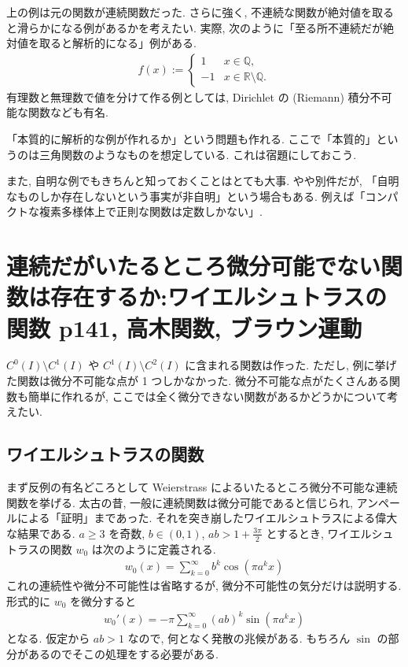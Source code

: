 \documentclass[openany, a4paper, oneside]{book}
\theoremstyle{break}
\theoremstyle{breakdefn}
\begin{document}
上の例は元の関数が連続関数だった.
さらに強く, 不連続な関数が絶対値を取ると滑らかになる例があるかを考えたい.
実際, 次のように「至る所不連続だが絶対値を取ると解析的になる」例がある.
\begin{align}
 f (x)
 :=
 \begin{cases}
  1  & x \in \mathbb{Q}, \\
  -1 & x \in \mathbb{R} \setminus \mathbb{Q}.
 \end{cases}
\end{align}
有理数と無理数で値を分けて作る例としては, Dirichlet の (Riemann) 積分不可能な関数なども有名.

「本質的に解析的な例が作れるか」という問題も作れる.
ここで「本質的」というのは三角関数のようなものを想定している.
これは宿題にしておこう.

また, 自明な例でもきちんと知っておくことはとても大事.
やや別件だが, 「自明なものしか存在しないという事実が非自明」という場合もある.
例えば「コンパクトな複素多様体上で正則な関数は定数しかない」.
\section{連続だがいたるところ微分可能でない関数は存在するか:ワイエルシュトラスの関数 \cite{WilliamDumham1} p141, 高木関数, ブラウン運動}
\label{sec-11-3-6}

$C^0 (I) \setminus C^1 (I)$ や $C^1 (I) \setminus C^2 (I)$ に含まれる関数は作った.
ただし, 例に挙げた関数は微分不可能な点が 1 つしかなかった.
微分不可能な点がたくさんある関数も簡単に作れるが, ここでは全く微分できない関数があるかどうかについて考えたい.
\subsection{ワイエルシュトラスの関数}
\label{sec-11-3-6-1}

まず反例の有名どころとして Weierstrass によるいたるところ微分不可能な連続関数を挙げる.
太古の昔, 一般に連続関数は微分可能であると信じられ, アンペールによる「証明」まであった.
それを突き崩したワイエルシュトラスによる偉大な結果である.
$a \geq 3$ を奇数, $b \in (0, 1)$, $ab > 1 + \frac{3 \pi}{2}$ とするとき,
ワイエルシュトラスの関数 $w_0$ は次のように定義される.
\begin{align}
 w_0 (x)
 =
 \sum_{k=0}^{\infty} b^k \cos (\pi a^k x)
\end{align}
これの連続性や微分不可能性は省略するが, 微分不可能性の気分だけは説明する.
形式的に $w_0$ を微分すると
\begin{align}
 w_0'(x)
 =
 -\pi \sum_{k=0}^{\infty} (ab)^k \sin (\pi a^k x)
\end{align}
となる.
仮定から $ab > 1$ なので, 何となく発散の兆候がある.
もちろん $\sin$ の部分があるのでそこの処理をする必要がある.
\end{document}
